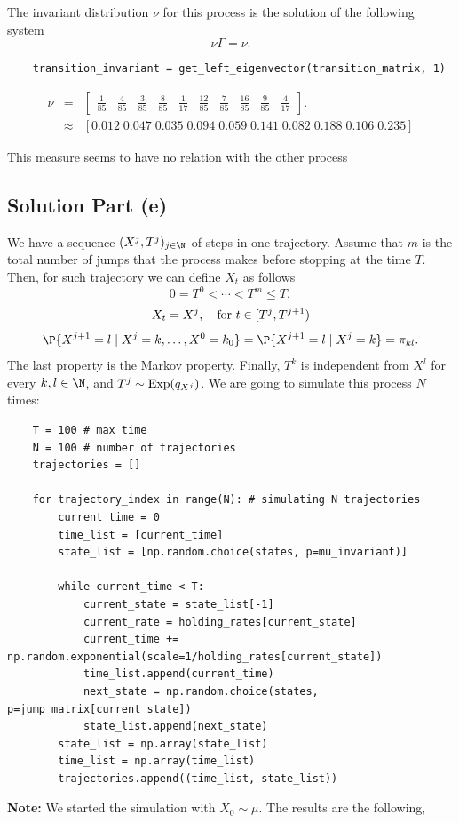 The invariant distribution $\nu$ for this process is the solution of the following system
\[ \nu \Gamma = \nu. \]
\begin{verbatim}
    transition_invariant = get_left_eigenvector(transition_matrix, 1)
\end{verbatim}
\[ \begin{array}{rcl}
    \nu & = & \left[\begin{matrix}\frac{1}{85} & \frac{4}{85} & \frac{3}{85} & \frac{8}{85} & \frac{1}{17} & \frac{12}{85} & \frac{7}{85} & \frac{16}{85} & \frac{9}{85} & \frac{4}{17}\end{matrix}\right].\\[5mm]
    & \approx & [0.012\; 0.047\; 0.035\; 0.094\; 0.059\; 0.141\; 0.082\; 0.188\; 0.106\; 0.235]
\end{array} \]

This measure seems to have no relation with the other process

\subsection*{Solution Part (e)}

We have a sequence $(X^j,T^j)_{j\in\N}$ of steps in one trajectory. Assume that $m$ is the total number of jumps that the process makes before stopping at the time $T$. Then, for such trajectory we can define $X_t$ as follows
\[ 0 = T^0 < \cdots < T^m \leq T, \]
\[ X_t = X^j,\hspace*{1em} \hbox{for } t \in [T^j, T^{j+1}) \]
\[ \P\{X^{j+1} = l \;|\; X^{j} = k, \ldots, X^0 = k_0\} = \P\{X^{j+1} = l \;|\; X^{j} = k\} = \pi_{kl}. \]
The last property is the Markov property. Finally, $T^k$ is independent from $X^l$ for every $k,l\in\N$, and $T^j \sim \hbox{Exp}(q_{X^j})$. We are going to simulate this process $N$ times:

\begin{verbatim}
    T = 100 # max time
    N = 100 # number of trajectories
    trajectories = []

    for trajectory_index in range(N): # simulating N trajectories
        current_time = 0
        time_list = [current_time]
        state_list = [np.random.choice(states, p=mu_invariant)]

        while current_time < T:
            current_state = state_list[-1]
            current_rate = holding_rates[current_state]
            current_time += np.random.exponential(scale=1/holding_rates[current_state])
            time_list.append(current_time)
            next_state = np.random.choice(states, p=jump_matrix[current_state])
            state_list.append(next_state)
        state_list = np.array(state_list)
        time_list = np.array(time_list)
        trajectories.append((time_list, state_list))
\end{verbatim}
\textbf{Note:} We started the simulation with $X_0 \sim \mu$. The results are the following,

